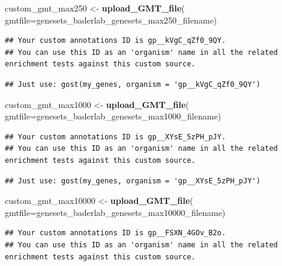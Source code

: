 \documentclass[
]{book}
\newenvironment{Shaded}{\begin{snugshade}}{\end{snugshade}}
\newcommand{\AttributeTok}[1]{\textcolor[rgb]{0.13,0.29,0.53}{#1}}
\newcommand{\FunctionTok}[1]{\textcolor[rgb]{0.13,0.29,0.53}{\textbf{#1}}}
\newcommand{\NormalTok}[1]{#1}
\newcommand{\OtherTok}[1]{\textcolor[rgb]{0.56,0.35,0.01}{#1}}
\begin{document}
\begin{Shaded}
\begin{Highlighting}[]
\NormalTok{custom\_gmt\_max250 }\OtherTok{\textless{}{-}} \FunctionTok{upload\_GMT\_file}\NormalTok{(}
                        \AttributeTok{gmtfile=}\NormalTok{genesets\_baderlab\_genesets\_max250\_filename)}
\end{Highlighting}
\end{Shaded}

\begin{verbatim}
## Your custom annotations ID is gp__kVgC_qZf0_9QY.
## You can use this ID as an 'organism' name in all the related enrichment tests against this custom source.
\end{verbatim}

\begin{verbatim}
## Just use: gost(my_genes, organism = 'gp__kVgC_qZf0_9QY')
\end{verbatim}

\begin{Shaded}
\begin{Highlighting}[]
\NormalTok{custom\_gmt\_max1000 }\OtherTok{\textless{}{-}} \FunctionTok{upload\_GMT\_file}\NormalTok{(}
                        \AttributeTok{gmtfile=}\NormalTok{genesets\_baderlab\_genesets\_max1000\_filename)}
\end{Highlighting}
\end{Shaded}

\begin{verbatim}
## Your custom annotations ID is gp__XYsE_5zPH_pJY.
## You can use this ID as an 'organism' name in all the related enrichment tests against this custom source.
\end{verbatim}

\begin{verbatim}
## Just use: gost(my_genes, organism = 'gp__XYsE_5zPH_pJY')
\end{verbatim}

\begin{Shaded}
\begin{Highlighting}[]
\NormalTok{custom\_gmt\_max10000 }\OtherTok{\textless{}{-}} \FunctionTok{upload\_GMT\_file}\NormalTok{(}
                        \AttributeTok{gmtfile=}\NormalTok{genesets\_baderlab\_genesets\_max10000\_filename)}
\end{Highlighting}
\end{Shaded}

\begin{verbatim}
## Your custom annotations ID is gp__FSXN_4GOv_B2o.
## You can use this ID as an 'organism' name in all the related enrichment tests against this custom source.
\end{verbatim}
\end{document}
